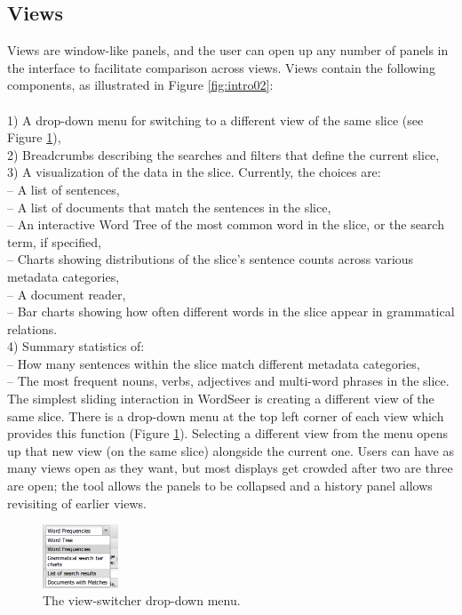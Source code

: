 \documentclass{sig-alternate}
\begin{document}
\subsection{Views}
Views  are window-like panels, and the user can open up any number of panels in the interface to facilitate comparison across views.  Views contain the following components, as illustrated in Figure \ref{fig:intro02}:
\\
\\ 1) A drop-down menu for switching to a different view of the same slice (see Figure \ref{fig:chris03}),
\\ 2) Breadcrumbs describing the searches and filters that define the current slice,
\\ 3)  A visualization of the data in the slice. Currently, the choices are:
\\ \indent -- A list of sentences,
\\ \indent -- A list of documents that match the sentences in the slice,
\\ \indent -- An interactive Word Tree \cite{wattenberg_word_2008} of the most common word in the slice, or the search term, if specified,
\\ \indent -- Charts showing distributions of the slice's sentence counts across various metadata categories,
\\ \indent -- A document reader,
\\ \indent -- Bar charts showing how often different words in the slice  appear in grammatical relations.
\\ 4) Summary statistics of:
\\ \indent -- How many sentences within the slice match different metadata categories,
\\ \indent -- The most frequent nouns, verbs, adjectives and multi-word phrases in the slice.
\\

The simplest sliding interaction in WordSeer is creating a different view of the same slice.  There is a drop-down menu at the top left corner of each view which provides this function (Figure \ref{fig:chris03}).  Selecting a different view from the menu opens up that new view (on the same slice) alongside the current one. Users can have as many views open as they want, but most displays get crowded after two are three are open; the tool allows the panels to be collapsed and a history panel allows revisiting of earlier views.  
\begin{figure}[h!]
\begin{center}
\includegraphics[width=0.2\textwidth]{fig/chris/03.png}
\end{center}
\caption{ The view-switcher drop-down menu.\label{fig:chris03}}
\end{figure}
\end{document}
